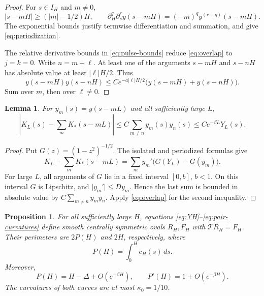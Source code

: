 \documentclass[11pt]{article}
\numberwithin{equation}{section}
\newtheorem{proposition}[theorem]{Proposition}
\newtheorem{lemma}[theorem]{Lemma}
\newcommand{\Tmap}{\mathcal T}
\newcommand{\abs}[1]{\lvert #1\rvert}
\begin{document}
\begin{proof}
For \(s\in I_H\) and \(m\ne0\),
\[
  \abs{s-mH}\geq(\abs m-1/2)H,\qquad
  \partial_H^q\partial_s^r y(s-mH)=(-m)^q y^{(r+q)}(s-mH).
\]
The exponential bounds justify termwise differentiation and summation,
and give \eqref{eq:periodization}.

The relative derivative bounds in \eqref{eq:pulse-bounds} reduce
\eqref{eq:overlap} to \(j=k=0\). Write
\(n=m+\ell\). At least one of the arguments \(s-mH\) and \(s-nH\) has
absolute value at least \(\abs\ell H/2\). Thus
\[
  y(s-mH)y(s-nH)
  \leq Ce^{-a\abs\ell H/2}\bigl(y(s-mH)+y(s-nH)\bigr).
\]
Sum over \(m\), then over \(\ell\ne0\).
\end{proof}

\begin{lemma}\label{lem:front-error}
For \(y_m(s)=y(s-mL)\) and all sufficiently large \(L\),
\begin{equation}\label{eq:front-error}
  \left|K_L(s)-\sum_m K_*(s-mL)\right|
  \leq C\sum_{m\ne n}y_m(s)y_n(s)
  \leq Ce^{-\beta L}Y_L(s).
\end{equation}
\end{lemma}

\begin{proof}
Put \(G(z)=(1-z^2)^{-1/2}\). The isolated and periodized formulas give
\[
  K_L-\sum_m K_*(s-mL)
  =\sum_m y_m'\bigl(G(Y_L)-G(y_m)\bigr).
\]
For large \(L\), all arguments of \(G\) lie in a fixed interval
\([0,b]\), \(b<1\). On this interval \(G\) is Lipschitz, and
\(\abs{y_m'}\leq D y_m\). Hence the last sum is bounded in absolute value
by \(C\sum_{m\ne n}y_my_n\). Apply \eqref{eq:overlap} for the second
inequality.
\end{proof}

\begin{proposition}\label{prop:pairs}
For all sufficiently large \(H\), equations
\eqref{eq:YH}--\eqref{eq:pair-curvatures} define smooth centrally symmetric
ovals \(R_H,F_H\) with \(\Tmap R_H=F_H\). Their perimeters are \(2P(H)\)
and \(2H\), respectively, where
\begin{equation}\label{eq:PH}
  P(H)=\int_0^H c_H(s)\,ds.
\end{equation}
Moreover,
\begin{equation}\label{eq:P-asymptotics}
  P(H)=H-\Delta+O(e^{-\beta H}),\qquad
  P'(H)=1+O(e^{-\beta H}).
\end{equation}
The curvatures of both curves are at most \(\kappa_0=1/10\).
\end{proposition}
\end{document}
